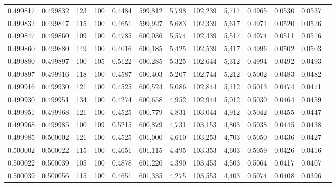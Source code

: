 \begin{tabular}{rrrrrrrrrrrrr}
0.499817 & 0.499832 &   123 & 100 &                                     0.4484 & 599,812 &   5,798 & 102,239 &   5,717 & 0.4965 & 0.0530 & 0.0537 \\
0.499832 & 0.499847 &   115 & 100 &                                     0.4651 & 599,927 &   5,683 & 102,339 &   5,617 & 0.4971 & 0.0520 & 0.0526 \\
0.499847 & 0.499860 &   109 & 100 &                                     0.4785 & 600,036 &   5,574 & 102,439 &   5,517 & 0.4974 & 0.0511 & 0.0516 \\
0.499860 & 0.499880 &   149 & 100 &                                     0.4016 & 600,185 &   5,425 & 102,539 &   5,417 & 0.4996 & 0.0502 & 0.0503 \\
0.499880 & 0.499897 &   100 & 105 &                                     0.5122 & 600,285 &   5,325 & 102,644 &   5,312 & 0.4994 & 0.0492 & 0.0493 \\
0.499897 & 0.499916 &   118 & 100 &                                     0.4587 & 600,403 &   5,207 & 102,744 &   5,212 & 0.5002 & 0.0483 & 0.0482 \\
0.499916 & 0.499930 &   121 & 100 &                                     0.4525 & 600,524 &   5,086 & 102,844 &   5,112 & 0.5013 & 0.0474 & 0.0471 \\
0.499930 & 0.499951 &   134 & 100 &                                     0.4274 & 600,658 &   4,952 & 102,944 &   5,012 & 0.5030 & 0.0464 & 0.0459 \\
0.499951 & 0.499968 &   121 & 100 &                                     0.4525 & 600,779 &   4,831 & 103,044 &   4,912 & 0.5042 & 0.0455 & 0.0447 \\
0.499968 & 0.499985 &   100 & 109 &                                     0.5215 & 600,879 &   4,731 & 103,153 &   4,803 & 0.5038 & 0.0445 & 0.0438 \\
0.499985 & 0.500002 &   121 & 100 &                                     0.4525 & 601,000 &   4,610 & 103,253 &   4,703 & 0.5050 & 0.0436 & 0.0427 \\
0.500002 & 0.500022 &   115 & 100 &                                     0.4651 & 601,115 &   4,495 & 103,353 &   4,603 & 0.5059 & 0.0426 & 0.0416 \\
0.500022 & 0.500039 &   105 & 100 &                                     0.4878 & 601,220 &   4,390 & 103,453 &   4,503 & 0.5064 & 0.0417 & 0.0407 \\
0.500039 & 0.500056 &   115 & 100 &                                     0.4651 & 601,335 &   4,275 & 103,553 &   4,403 & 0.5074 & 0.0408 & 0.0396 \\

\end{tabular}
